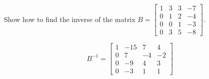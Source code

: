 
\begin{exerciseStatement}


Show how to find the inverse of the matrix \(B= \left[\begin{array}{cccc}
1 & 3 & 3 & -7 \\
0 & 1 & 2 & -4 \\
0 & 0 & 1 & -3 \\
0 & 3 & 5 & -8
\end{array}\right] \).


\end{exerciseStatement}
    
\begin{exerciseAnswer} 
\[B^{-1}= \left[\begin{array}{cccc}
1 & -15 & 7 & 4 \\
0 & 7 & -4 & -2 \\
0 & -9 & 4 & 3 \\
0 & -3 & 1 & 1
\end{array}\right] \]
\end{exerciseAnswer}
    
